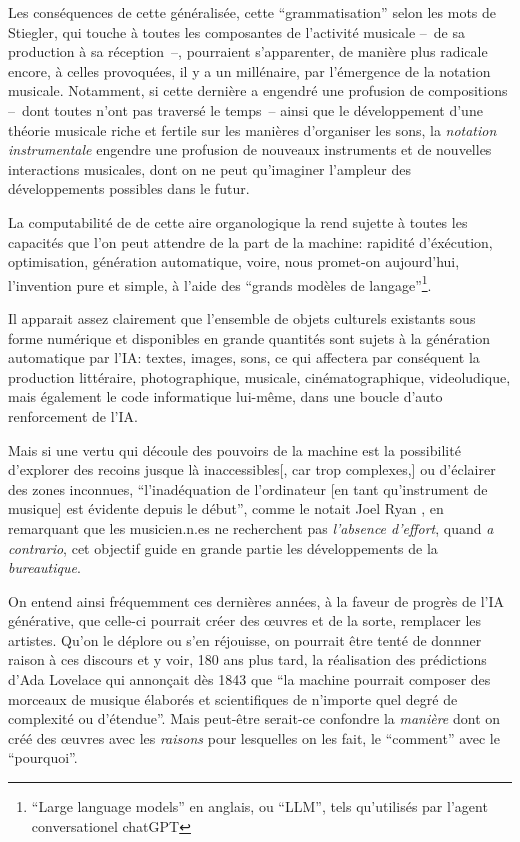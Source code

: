 Les conséquences de cette  généralisée, cette ``grammatisation'' selon les mots de Stiegler, qui touche à toutes les composantes de l'activité musicale --~de sa production à sa réception~--, pourraient s'apparenter, de manière plus radicale encore, à celles provoquées, il y a un millénaire, par l'émergence de la notation musicale. Notamment, si cette dernière a engendré une profusion de compositions --~dont toutes n'ont pas traversé le temps~-- ainsi que le développement d'une théorie musicale riche et fertile sur les manières d'organiser les sons, la \textit{notation instrumentale} engendre une profusion de nouveaux instruments et de nouvelles interactions musicales, dont on ne peut qu'imaginer l'ampleur des développements possibles dans le futur.

La computabilité de de cette aire organologique la rend sujette à toutes les capacités que l'on peut attendre de la part de la machine: rapidité d'éxécution, optimisation, génération automatique, voire, nous promet-on aujourd'hui, l'invention pure et simple, à l'aide des ``grands modèles de langage''\footnote{``Large language models'' en anglais, ou ``LLM'', tels qu'utilisés par l'agent conversationel chatGPT}. 

Il apparait assez clairement que l'ensemble de objets culturels existants sous forme numérique et disponibles en grande quantités sont sujets à la génération automatique par l'IA: textes, images, sons, ce qui affectera par conséquent la production littéraire, photographique, musicale, cinématographique, videoludique, mais également le code informatique lui-même, dans une boucle d'auto renforcement de l'IA.


Mais si une vertu qui découle des pouvoirs de la machine est la possibilité d'explorer des recoins jusque là inaccessibles[, car trop complexes,] ou d'éclairer des zones inconnues, ``l'inadéquation de l'ordinateur [en tant qu'instrument de musique] est évidente depuis le début'', comme le notait Joel Ryan \cite{ryan_remarks_1991}, en remarquant que les musicien.n.es ne recherchent pas \textit{l'absence d'effort}, quand \textit{a contrario}, cet objectif guide en grande partie les développements de la \textit{bureautique}.

On entend ainsi fréquemment ces dernières années, à la faveur de progrès de l'IA générative, que celle-ci pourrait créer des œuvres et de la sorte, remplacer les artistes. Qu'on le déplore ou s'en réjouisse, on pourrait être tenté de donnner raison à ces discours et y voir, 180 ans plus tard, la réalisation des prédictions d'Ada Lovelace qui annonçait dès 1843 que ``la machine pourrait composer des morceaux de musique élaborés et scientifiques de n’importe quel degré de complexité ou d’étendue''\cite{lovelace_translators_1843}. Mais peut-être serait-ce confondre la \textit{manière} dont on créé des œuvres avec les \textit{raisons} pour lesquelles on les fait, le ``comment'' avec le ``pourquoi''.

